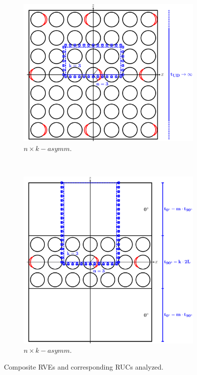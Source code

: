 \begin{figure}[!h]
    \begin{subfigure}[b]{0.475\textwidth}
        \includegraphics[width=\textwidth]{paperE/asymm.pdf}
        \caption{$n\times k-asymm$.}\label{paperE:fig:rves-c}
    \end{subfigure} ~
   \begin{subfigure}[b]{0.475\textwidth}
        \includegraphics[width=\textwidth]{paperE/ThickPlyCP.pdf}
        \caption{$n\times k-asymm$.}\label{paperE:fig:rves-d}
    \end{subfigure}

\caption{Composite RVEs and corresponding RUCs analyzed.}\label{paperE:fig:rves}
\end{figure}


